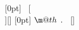 
\patchcmd{\makecvtitle}{\newlength{\makecvtitledetailswidth}}{\let\makecvtitledetailswidth\relax\newlength{\makecvtitledetailswidth}}{}{}
\patchcmd{\makecvtitle}{\newlength{\makecvtitlepicturewidth}}{\let\makecvtitlepicturewidth\relax\newlength{\makecvtitlepicturewidth}}{}{}

\newcommand{\part}[1]{%
\addcontentsline{toc}{part}{#1}%
}

\makeatletter
\newcommand\@pnumwidth{1.55em}
\newcommand\@tocrmarg{2.55em}
\newcommand\@dotsep{8}
\newcommand\contentsname{Contents}
\setlength\columnsep{20pt}
\setcounter{tocdepth}{0}
\newcommand\tableofcontents{%
  \addtocontents{toc}{\protect\setcounter{tocdepth}{0}}
  \newbox{\makecvtitlenamebox}
  \savebox{\makecvtitlenamebox}{%
    \namestyle{\@firstname\ \@lastname}%
  }
  \section*{\contentsname}
  \@starttoc{toc}%
}
\usepackage{titletoc}
[0pt]
  {}{}{\textbullet}
  {\ \thecontentspage}[\\][]
[0pt]
  {}{}{
  }
  {\leaders\hbox{\normalfont$\m@th\mkern \@dotsep mu\hbox{.}\mkern \@dotsep mu$}\hfill\normalsize\thecontentspage
  }[]
\renewcommand\l@subsection[2]{}
\makeatother